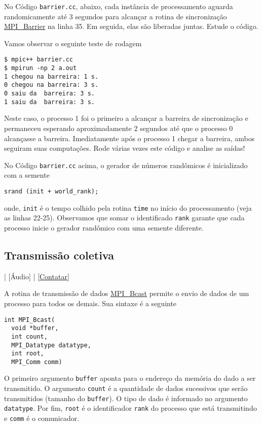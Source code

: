 \begin{ex}
  No Código \verb+barrier.cc+, abaixo, cada instância de processamento aguarda randomicamente até 3 segundos para alcançar a rotina de sincronização \href{https://www.open-mpi.org/doc/current/man3/MPI\_Barrier.3.php}{MPI\_Barrier} na linha 35. Em seguida, elas são liberadas juntas. Estude o código.



Vamos observar o seguinte teste de rodagem
\begin{verbatim}
$ mpic++ barrier.cc
$ mpirun -np 2 a.out                                                          
1 chegou na barreira: 1 s.
0 chegou na barreira: 3 s.
0 saiu da  barreira: 3 s.
1 saiu da  barreira: 3 s.
\end{verbatim}
Neste caso, o processo 1 foi o primeiro a alcançar a barreira de sincronização e permaneceu esperando aproximadamente 2 segundos até que o processo 0 alcançasse a barreira. Imediatamente após o processo 1 chegar a barreira, ambos seguiram suas computações. Rode várias vezes este código e analise as saídas!
\end{ex}

\begin{obs}
  No Código \verb+barrier.cc+ acima, o gerador de números randômicos é inicializado com a semente
\begin{verbatim}
srand (init + world_rank);
\end{verbatim}
  onde, \verb+init+ é o tempo colhido pela rotina \verb+time+ no início do processamento (veja as linhas 22-25). Observamos que somar o identificado \verb+rank+ garante que cada processo inicie o gerador randômico com uma semente diferente.
\end{obs}

\subsection {Transmissão coletiva}

\begin{flushright}
  [Vídeo] | [Áudio] | \href{https://phkonzen.github.io/notas/contato.html}{[Contatar]}
\end{flushright}

A rotina de transmissão de dados \href{https://www.open-mpi.org/doc/current/man3/MPI\_Bcast.3.php}{MPI\_Bcast} permite o envio de dados de um processo para todos os demais. Sua sintaxe é a seguinte
\begin{verbatim}
int MPI_Bcast(
  void *buffer, 
  int count, 
  MPI_Datatype datatype,
  int root, 
  MPI_Comm comm)
\end{verbatim}
O primeiro argumento \verb+buffer+ aponta para o endereço da memória do dado a ser transmitido. O argumento \verb+count+ é a quantidade de dados sucessivos que serão transmitidos (tamanho do \verb+buffer+). O tipo de dado é informado no argumento \verb+datatype+. Por fim, \verb+root+ é o identificador \verb+rank+ do processo que está transmitindo e \verb+comm+ é o comunicador.

